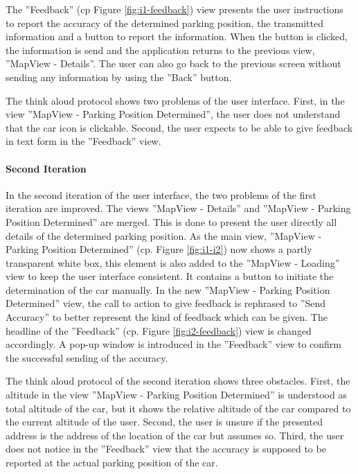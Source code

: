 The ''Feedback'' (cp Figure \ref{fig:i1-feedback}) view presents the user instructions to report the accuracy of the determined parking position, the transmitted information and a button to report the information. When the button is clicked, the information is send and the application returns to the previous view, ''MapView - Details''. The user can also go back to the previous screen without sending any information by using the ''Back'' button.


The think aloud protocol shows two problems of the user interface. First, in the view ''MapView - Parking Position Determined'', the user does not understand that the car icon is clickable. Second, the user expects to be able to give feedback in text form in the ''Feedback'' view.

\paragraph{Second Iteration}

In the second iteration of the user interface, the two problems of the first iteration are improved. The views ''MapView - Details'' and ''MapView - Parking Position Determined'' are merged. This is done to present the user directly all details of the determined parking position. 
As the main view, ''MapView - Parking Position Determined'' (cp. Figure \ref{fig:i1-i2}) now shows a partly transparent white box, this element is also added to the ''MapView - Loading'' view to keep the user interface consistent. It contains a button to initiate the determination of the car manually. 
In the new ''MapView - Parking Position Determined'' view, the call to action to give feedback is rephrased to ''Send Accuracy'' to better represent the kind of feedback which can be given. The headline of the ''Feedback'' (cp. Figure \ref{fig:i2-feedback}) view is changed accordingly. A pop-up window is introduced in the ''Feedback'' view to confirm the successful sending of the accuracy.

The think aloud protocol of the second iteration shows three obstacles. First, the altitude in the view ''MapView - Parking Position Determined'' is understood as total altitude of the car, but it shows the relative altitude of the car compared to the current altitude of the user. Second, the user is unsure if the presented address is the address of the location of the car but assumes so. Third, the user does not notice in the ''Feedback'' view that the accuracy is supposed to be reported at the actual parking position of the car.


